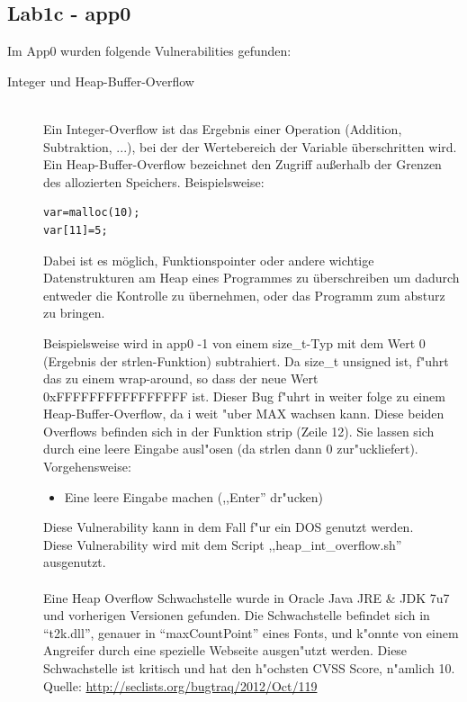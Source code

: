 \documentclass[12pt,a4paper,titlepage,oneside]{scrartcl}
\begin{document}
\subsection{Lab1c - app0}
Im App0 wurden folgende Vulnerabilities gefunden:
\begin{description}
  \item[Integer und Heap-Buffer-Overflow] \hfill \\
  	 Ein Integer-Overflow ist das Ergebnis einer Operation (Addition, Subtraktion, ...), bei der der Wertebereich der Variable überschritten wird.\newline
  	 Ein Heap-Buffer-Overflow bezeichnet den Zugriff außerhalb der Grenzen des allozierten Speichers. Beispielsweise:
  	 \begin{lstlisting}
var=malloc(10);
var[11]=5;
	\end{lstlisting}
	Dabei ist es möglich, Funktionspointer oder andere wichtige Datenstrukturen am Heap eines Programmes zu überschreiben um dadurch entweder die Kontrolle zu übernehmen, oder das Programm zum absturz zu bringen.\newline
	
  	 Beispielsweise wird in app0 -1 von einem size\_t-Typ mit dem Wert 0 (Ergebnis der strlen-Funktion) subtrahiert. Da size\_t unsigned ist, f"uhrt das zu einem wrap-around, so dass der neue Wert 0xFFFFFFFFFFFFFFFF ist. \newline
    Dieser Bug f"uhrt in weiter folge zu einem Heap-Buffer-Overflow, da i weit "uber MAX wachsen kann.\newline
    Diese beiden Overflows befinden sich in der Funktion strip (Zeile 12). Sie lassen sich durch eine leere Eingabe ausl"osen (da strlen dann 0 zur"uckliefert).\newline
    Vorgehensweise:
    \begin{itemize}
    \item Eine leere Eingabe machen (,,Enter'' dr"ucken)
    \end {itemize}
    Diese Vulnerability kann in dem Fall f"ur ein DOS genutzt werden.\\
    Diese Vulnerability wird mit dem Script ,,heap\_int\_overflow.sh'' ausgenutzt.\\
    \\
    Eine Heap Overflow Schwachstelle wurde in Oracle Java JRE \& JDK 7u7 und vorherigen Versionen gefunden. Die Schwachstelle befindet sich in ``t2k.dll'', genauer in ``maxCountPoint'' eines Fonts, und k"onnte von einem Angreifer durch eine spezielle Webseite ausgen"utzt werden. Diese Schwachstelle ist kritisch und hat den h"ochsten CVSS Score, n"amlich 10.\newline
    Quelle: \url{http://seclists.org/bugtraq/2012/Oct/119}
    

\end{description}
\end{document}
